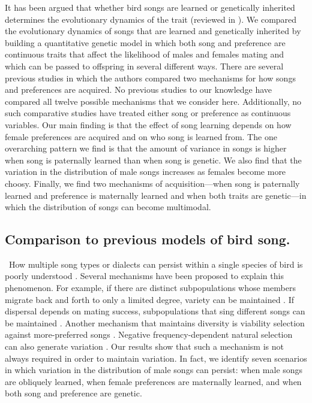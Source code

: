 \documentclass[12pt]{article}
\begin{document}
It has been argued that whether bird songs are learned or genetically inherited determines the evolutionary dynamics of the trait (reviewed in \cite{Wilkins:2012ve,Lachlan:2004tg}). We compared the evolutionary dynamics of songs that are learned and genetically inherited by building a quantitative genetic model in which both song and preference are continuous traits that affect the likelihood of males and females mating and which can be passed to offspring in several different ways. There are several previous studies in which the authors compared two mechanisms for how songs and preferences are acquired. No previous studies to our knowledge have compared all twelve possible mechanisms that we consider here. Additionally, no such comparative studies have treated either song or preference as continuous variables. Our main finding is that the effect of song learning depends on how female preferences are acquired and on who song is learned from. The one overarching pattern we find is that the amount of variance in songs is higher when song is paternally learned than when song is genetic. We also find that the variation in the distribution of male songs increases as females become more choosy. Finally, we find two mechanisms of acquisition---when song is paternally learned and preference is maternally learned and when both traits are genetic---in which the distribution of songs can become multimodal.  


\subsection*{Comparison to previous models of bird song. }
\ How multiple song types or dialects can persist within a single species of bird is poorly understood \cite{Weissing:2011hc,Planque:2014qf}. Several mechanisms have been proposed to explain this phenomenon. For example, if there are distinct subpopulations whose members migrate back and forth to only a limited degree, variety can be maintained \cite{Planque:2014qf,Yeh:2015bh,Ellers:2003zr}. If dispersal depends on mating success, subpopulations that sing different songs can be maintained \cite{Payne:1997fk}. Another mechanism that maintains diversity is viability selection against more-preferred songs \cite{Planque:2014qf,Yeh:2015bh}. Negative frequency-dependent natural selection can also generate variation \cite{Verzijden:2005vn}. Our results show that such a mechanism is not always required in order to maintain variation. In fact, we identify seven scenarios in which variation in the distribution of male songs can persist: when male songs are obliquely learned, when female preferences are maternally learned, and when both song and preference are genetic.
\end{document}
